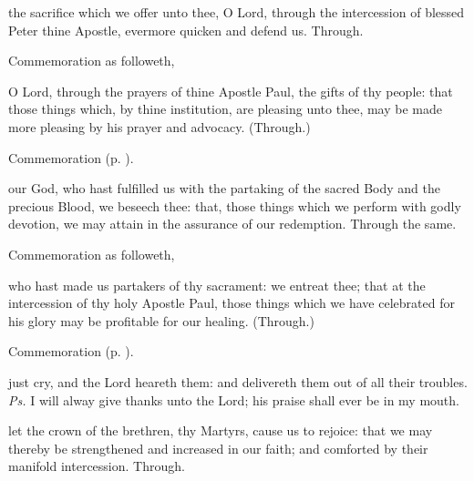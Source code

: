 \secret
{} the sacrifice which we offer unto thee, O Lord, through the intercession of blessed Peter thine Apostle, evermore quicken and defend us. Through.

\begin{rubric}
	 Commemoration  as followeth,
\end{rubric}
 O Lord, through the prayers of thine Apostle Paul, the gifts of thy people: that those things which, by thine institution, are pleasing unto thee, may be made more pleasing by his prayer and advocacy. (Through.)

\begin{rubric}
	 Commemoration  (p. \pageref{HolyMaccabeesSecret}).
\end{rubric}


\postcommunion
{} our God, who hast fulfilled us with the partaking of the sacred Body and the precious Blood, we beseech thee: that, those things which we perform with godly devotion, we may attain in the assurance of our redemption. Through the same.

\begin{rubric}
	 Commemoration  as followeth,
\end{rubric}

\clearpage
{} who hast made us partakers of thy sacrament: we entreat thee; that at the intercession of thy holy Apostle Paul, those things which we have celebrated for his glory may be profitable for our healing. (Through.)

\begin{rubric}
	 Commemoration  (p. \pageref{HolyMaccabeesPostcommunion}).
\end{rubric}



\introit
{} just cry, and the Lord heareth them: and delivereth them out of all their troubles. \textit{Ps.} I will alway give thanks unto the Lord; his praise shall ever be in my mouth.

\collect\label{HolyMaccabeesCollect}
 let the crown of the brethren, thy Martyrs, cause us to rejoice: that we may thereby be strengthened and increased in our faith; and comforted by their manifold intercession. Through.

